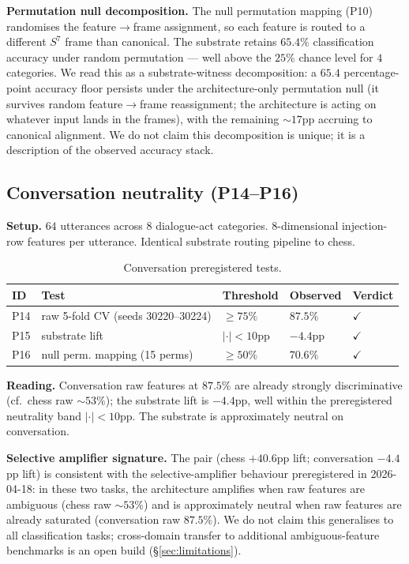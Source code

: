 \textbf{Permutation null decomposition.} The null permutation
mapping (P10) randomises the feature$\to$frame assignment, so each
feature is routed to a different $S^{7}$ frame than canonical. The
substrate retains $65.4\%$ classification accuracy under random
permutation — well above the $25\%$ chance level for $4$ categories.
We read this as a substrate-witness decomposition:
a $65.4$ percentage-point accuracy floor persists under the
architecture-only permutation null (it survives random
feature$\to$frame reassignment; the architecture is acting on whatever
input lands in the frames), with the remaining $\sim 17$pp accruing
to canonical alignment. We do not claim this decomposition is
unique; it is a description of the observed accuracy stack.

\subsection{Conversation neutrality (P14--P16)}\label{ssec:conv}

\textbf{Setup.} $64$ utterances across $8$ dialogue-act categories.
$8$-dimensional injection-row features per utterance. Identical
substrate routing pipeline to chess.

\begin{table}[ht]
\centering
\small
\caption{Conversation preregistered tests.}
\label{tab:conv_prereg}
\begin{tabular}{l l l l l}
\toprule
ID & Test & Threshold & Observed & Verdict \\
\midrule
P14 & raw 5-fold CV (seeds 30220--30224)    & $\geq 75\%$ & $87.5\%$ & $\checkmark$ \\
P15 & substrate lift                         & $|\cdot| < 10$pp & $-4.4$pp & $\checkmark$ \\
P16 & null perm. mapping (15 perms)         & $\geq 50\%$ & $70.6\%$ & $\checkmark$ \\
\bottomrule
\end{tabular}
\end{table}

\textbf{Reading.} Conversation raw features at $87.5\%$ are already
strongly discriminative (cf.\ chess raw $\sim 53\%$); the substrate
lift is $-4.4$pp, well within the preregistered neutrality band
$|\cdot|\!<\!10$pp. The substrate is approximately neutral on conversation.

\textbf{Selective amplifier signature.} The pair (chess
$+40.6$pp lift; conversation $-4.4$pp lift) is consistent with the
selective-amplifier behaviour preregistered in 2026-04-18: in these
two tasks, the architecture amplifies when raw features are ambiguous
(chess raw $\sim 53\%$) and is approximately neutral when raw features
are already saturated (conversation raw $87.5\%$). We do not claim
this generalises to all classification tasks; cross-domain transfer
to additional ambiguous-feature benchmarks is an open build
(\S\ref{sec:limitations}).

